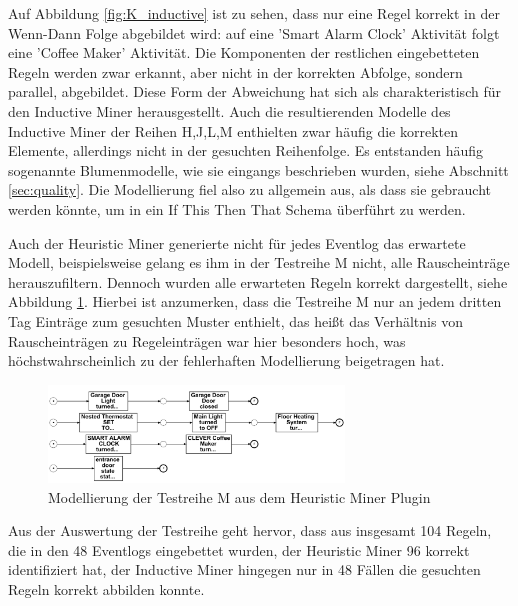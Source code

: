 Auf Abbildung \ref{fig:K_inductive} ist zu sehen, dass nur eine Regel korrekt in der Wenn-Dann Folge abgebildet wird: auf eine 'Smart Alarm Clock' Aktivität folgt eine 'Coffee Maker' Aktivität. 
Die Komponenten der restlichen eingebetteten Regeln werden zwar erkannt, aber nicht in der korrekten Abfolge, sondern parallel, abgebildet. Diese Form der Abweichung hat sich als charakteristisch für den Inductive Miner herausgestellt. Auch die resultierenden Modelle des Inductive Miner der Reihen H,J,L,M enthielten zwar häufig  die korrekten Elemente, allerdings nicht in der gesuchten Reihenfolge. Es entstanden häufig sogenannte Blumenmodelle, wie sie eingangs beschrieben wurden, siehe Abschnitt \ref{sec:quality}. Die Modellierung fiel also zu allgemein aus, als dass sie gebraucht werden könnte, um in ein If This Then That Schema überführt zu werden.

Auch der Heuristic Miner generierte nicht für jedes Eventlog das erwartete Modell, beispielsweise gelang es ihm in der Testreihe M nicht, alle Rauscheinträge herauszufiltern. Dennoch wurden alle erwarteten Regeln korrekt dargestellt, siehe Abbildung \ref{fig:M_heuristic}. 
Hierbei ist anzumerken, dass die Testreihe M nur an jedem dritten Tag Einträge zum gesuchten Muster enthielt, das heißt das Verhältnis von Rauscheinträgen zu Regeleinträgen war hier besonders hoch, was höchstwahrscheinlich zu der fehlerhaften Modellierung beigetragen hat.
\begin{figure}[!ht]
    \centering
    \includegraphics[width=0.7\textwidth,]{figures/Appbildungen/M_Heuristic.PNG}
    \caption{Modellierung der Testreihe M aus dem Heuristic Miner Plugin}
    \label{fig:M_heuristic}
\end{figure}

Aus der Auswertung der Testreihe geht hervor, dass aus insgesamt 104 Regeln, die in den 48 Eventlogs eingebettet wurden, der Heuristic Miner 96 korrekt identifiziert hat, der Inductive Miner hingegen nur in 48 Fällen die gesuchten Regeln korrekt abbilden konnte.

